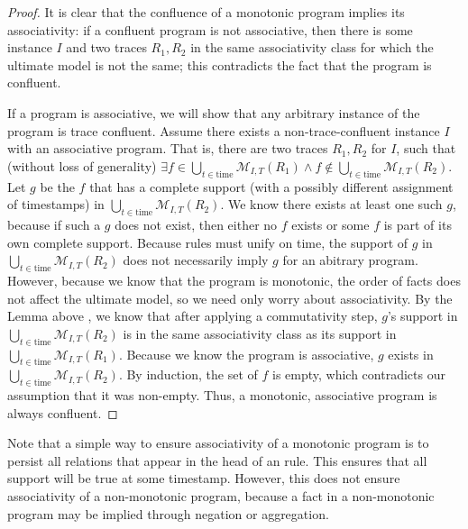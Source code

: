
\begin{proof}
%
It is clear that the confluence of a monotonic \lang program implies its
associativity: if a confluent \lang program is not associative, then there is
some instance $I$ and two traces $R_1, R_2$ in the same associativity class for
which the ultimate model is not the same; this contradicts the fact that the
program is confluent.

If a \lang program is associative, we will show that any arbitrary instance of
the \lang program is trace confluent.   Assume there exists a
non-trace-confluent \lang instance $I$ with an associative program.  That is,
there are two traces $R_1, R_2$ for $I$, such that (without loss of generality)
$\exists f \in \bigcup_{t \in \text{time}} \mathcal{M}_{I,T}(R_1) \land f
\not\in \bigcup_{t \in \text{time}} \mathcal{M}_{I,T}(R_2)$.  Let $g$ be the
$f$ that has a complete support (with a possibly different assignment of
timestamps) in $\bigcup_{t \in \text{time}} \mathcal{M}_{I,T}(R_2)$.  We know
there exists at least one such $g$, because if such a $g$ does not exist, then
either no $f$ exists or some $f$ is part of its own complete support.  Because
\lang rules must unify on time, the support of $g$ in $\bigcup_{t \in
\text{time}} \mathcal{M}_{I,T}(R_2)$ does not necessarily imply $g$ for an
abitrary program.  However, because we know that the program is monotonic, the
order of facts does not affect the ultimate model, so we need only worry about
associativity.  By the Lemma above , we know
that after applying a commutativity step, $g$'s support in $\bigcup_{t \in
\text{time}} \mathcal{M}_{I,T}(R_2)$ is in the same associativity class as its
support in $\bigcup_{t \in \text{time}} \mathcal{M}_{I,T}(R_1)$.  Because we
know the program is associative, $g$ exists in  $\bigcup_{t \in \text{time}}
\mathcal{M}_{I,T}(R_2)$.  By induction, the set of $f$ is empty, which
contradicts our assumption that it was non-empty.  Thus, a monotonic,
associative \lang program is always confluent.
%
\end{proof}

Note that a simple way to ensure associativity of a monotonic program is to
persist all relations that appear in the head of an  rule.
This ensures that all support will be true at some timestamp.  However, this
does not ensure associativity of a non-monotonic program, because a fact in a
non-monotonic program may be implied through negation or aggregation.

